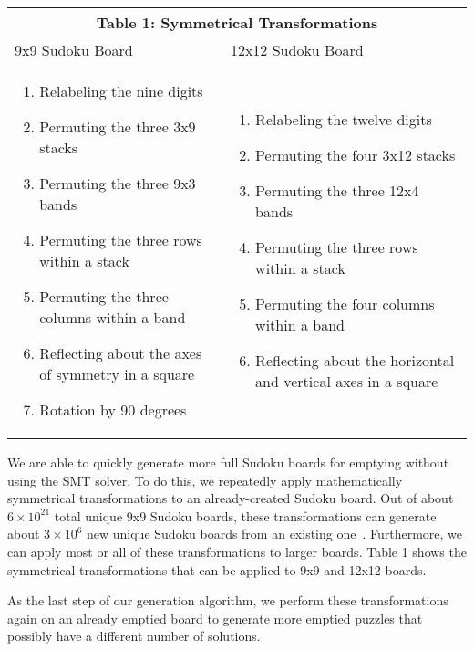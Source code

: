 \singlespace
\begin{table}
\begin{tabularx}{\textwidth}{|X|X|}
\hline
\multicolumn{2}{|c|}{Table 1: Symmetrical Transformations}\\
\hline
9x9 Sudoku Board & 12x12 Sudoku Board
\\
\hline
\begin{enumerate}
\item Relabeling the nine digits
\item Permuting the three 3x9 stacks
\item Permuting the three 9x3 bands
\item Permuting the three rows within a stack
\item Permuting the three columns within a band
\item Reflecting about the axes of symmetry in a square
\item Rotation by 90 degrees
\end{enumerate} &

\begin{enumerate}
\item Relabeling the twelve digits
\item Permuting the four 3x12 stacks
\item Permuting the three 12x4 bands
\item Permuting the three rows within a stack
\item Permuting the four columns within a band
\item Reflecting about the horizontal and vertical axes in a square
\end{enumerate}
 \\
\hline
\end{tabularx}
\end{table}

\doublespace

We are able to quickly generate more full Sudoku boards for emptying
without using the SMT solver. To do this, we repeatedly apply
mathematically symmetrical transformations to an already-created
Sudoku board. Out of about $6 \times 10^{21}$ total unique 9x9 Sudoku
boards, these transformations can generate about $3\times 10^6$ new
unique Sudoku boards from an existing one~\cite{sudokumath}. Furthermore, we
can apply most or all of these transformations to larger boards. Table
1 shows the symmetrical transformations that can be applied to 9x9 and
12x12 boards.

As the last step of our generation algorithm, we perform these transformations again on an already emptied board to generate more emptied puzzles that possibly have a different number of solutions.


